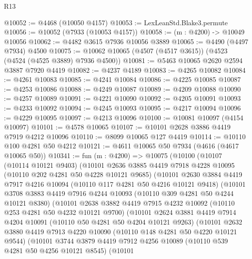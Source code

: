 \begin{lexlean}{R13}
\begin{coremodule}
@10052 := @4468 (@10050 @4157)
@10053 := LexLeanStd.Blake3.permute
@10056 := @10052 (@7933 (@10053 @4157))
@10058 := (m : @4200) -> @10049 @10056
@10062 := @4482 @3615 @7936 @10056 @3889
@10065 := @4490 (@4497 @7934) @4500
@10075 := @10062 @10065 (@4507 (@4517 @3615)) (@4523 (@4524 (@4525 @3889) @7936 @4500))
@10081 := @5463 @10065 @2620 @2594 @3887 @7920 @4419
@10082 := @4237 @4189
@10083 := @4265 @10082
@10084 := @4261 @10083
@10085 := @4241 @10084
@10086 := @4225 @10085
@10087 := @4253 @10086
@10088 := @4249 @10087
@10089 := @4209 @10088
@10090 := @4257 @10089
@10091 := @4221 @10090
@10092 := @4205 @10091
@10093 := @4233 @10092
@10094 := @4245 @10093
@10095 := @4217 @10094
@10096 := @4229 @10095
@10097 := @4213 @10096
@10100 := @10081 @10097 (@4154 @10097)
@10101 := @4578 @10065
@10107 := @10101 @2628 @3886 @4419 @7919 @4212 @10096
@10110 := @8099 @10065 @127 @4419
@10114 := @10110 @100 @4281 @50 @4212
@10121 := @4611 @10065 @50 @7934 (@4616 (@4617 @10065 @50))
@10341 := fun (m : @4200) =>
  @10075
    (@10100
      (@10107
        (@10114 @10121 @9403)
        (@10101
          @2636
          @3885
          @4419
          @7918
          @4228
          @10095
          (@10110 @202 @4281 @50 @4228 @10121 @9685)
          (@10101
            @2630
            @3884
            @4419
            @7917
            @4216
            @10094
            (@10110 @117 @4281 @50 @4216 @10121 @9418)
            (@10101
              @3708
              @3883
              @4419
              @7916
              @4244
              @10093
              (@10110 @309 @4281 @50 @4244 @10121 @8380)
              (@10101
                @2638
                @3882
                @4419
                @7915
                @4232
                @10092
                (@10110 @253 @4281 @50 @4232 @10121 @9700)
                (@10101
                  @2624
                  @3881
                  @4419
                  @7914
                  @4204
                  @10091
                  (@10110 @50 @4281 @50 @4204 @10121 @9263)
                  (@10101
                    @2632
                    @3880
                    @4419
                    @7913
                    @4220
                    @10090
                    (@10110 @148 @4281 @50 @4220 @10121 @9544)
                    (@10101
                      @3744
                      @3879
                      @4419
                      @7912
                      @4256
                      @10089
                      (@10110 @539 @4281 @50 @4256 @10121 @8545)
                      (@10101

\end{coremodule}
\end{lexlean}
